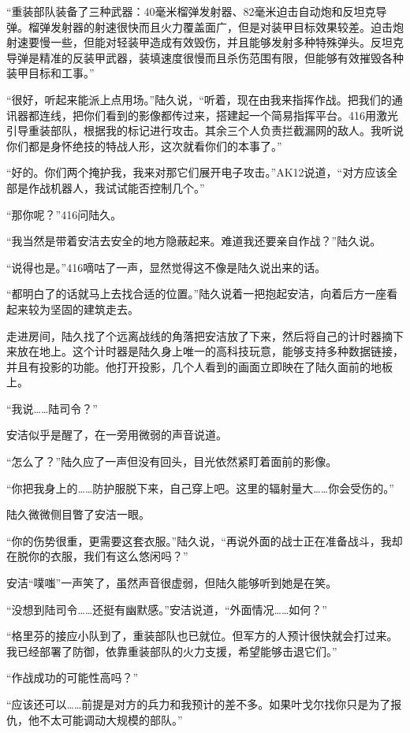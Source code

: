 “重装部队装备了三种武器：40毫米榴弹发射器、82毫米迫击自动炮和反坦克导弹。榴弹发射器的射速很快而且火力覆盖面广，但是对装甲目标效果较差。迫击炮射速要慢一些，但能对轻装甲造成有效毁伤，并且能够发射多种特殊弹头。反坦克导弹是精准的反装甲武器，装填速度很慢而且杀伤范围有限，但能够有效摧毁各种装甲目标和工事。”

“很好，听起来能派上点用场。”陆久说，“听着，现在由我来指挥作战。把我们的通讯器都连线，把你们看到的影像都传过来，搭建起一个简易指挥平台。416用激光引导重装部队，根据我的标记进行攻击。其余三个人负责拦截漏网的敌人。我听说你们都是身怀绝技的特战人形，这次就看你们的本事了。”

“好的。你们两个掩护我，我来对那它们展开电子攻击。”AK12说道，“对方应该全部是作战机器人，我试试能否控制几个。”

“那你呢？”416问陆久。

“我当然是带着安洁去安全的地方隐蔽起来。难道我还要亲自作战？”陆久说。

“说得也是。”416嘀咕了一声，显然觉得这不像是陆久说出来的话。

“都明白了的话就马上去找合适的位置。”陆久说着一把抱起安洁，向着后方一座看起来较为坚固的建筑走去。

走进房间，陆久找了个远离战线的角落把安洁放了下来，然后将自己的计时器摘下来放在地上。这个计时器是陆久身上唯一的高科技玩意，能够支持多种数据链接，并且有投影的功能。他打开投影，几个人看到的画面立即映在了陆久面前的地板上。

“我说……陆司令？”

安洁似乎是醒了，在一旁用微弱的声音说道。

“怎么了？”陆久应了一声但没有回头，目光依然紧盯着面前的影像。

“你把我身上的……防护服脱下来，自己穿上吧。这里的辐射量大……你会受伤的。”

陆久微微侧目瞥了安洁一眼。

“你的伤势很重，更需要这套衣服。”陆久说，“再说外面的战士正在准备战斗，我却在脱你的衣服，我们有这么悠闲吗？”

安洁“噗嗤”一声笑了，虽然声音很虚弱，但陆久能够听到她是在笑。

“没想到陆司令……还挺有幽默感。”安洁说道，“外面情况……如何？”

“格里芬的接应小队到了，重装部队也已就位。但军方的人预计很快就会打过来。我已经部署了防御，依靠重装部队的火力支援，希望能够击退它们。”

“作战成功的可能性高吗？”

“应该还可以……前提是对方的兵力和我预计的差不多。如果叶戈尔找你只是为了报仇，他不太可能调动大规模的部队。”

